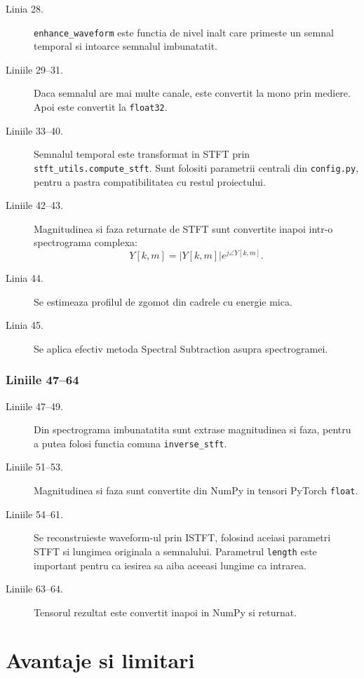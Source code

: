 \documentclass[12pt,a4paper]{report}
\newcommand{\codechunk}[2]{%
\subsection*{Liniile #1--#2}

}
\begin{document}
\begin{description}
    \item[Linia 28.] \texttt{enhance\_waveform} este functia de nivel inalt care
    primeste un semnal temporal si intoarce semnalul imbunatatit.

    \item[Liniile 29--31.] Daca semnalul are mai multe canale, este convertit la
    mono prin mediere. Apoi este convertit la \texttt{float32}.

    \item[Liniile 33--40.] Semnalul temporal este transformat in STFT prin
    \texttt{stft\_utils.compute\_stft}. Sunt folositi parametrii centrali din
    \texttt{config.py}, pentru a pastra compatibilitatea cu restul proiectului.

    \item[Liniile 42--43.] Magnitudinea si faza returnate de STFT sunt convertite
    inapoi intr-o spectrograma complexa:
    \[
    Y[k,m] = |Y[k,m]|e^{j\angle Y[k,m]}.
    \]

    \item[Linia 44.] Se estimeaza profilul de zgomot din cadrele cu energie mica.

    \item[Linia 45.] Se aplica efectiv metoda Spectral Subtraction asupra spectrogramei.
\end{description}

\codechunk{47}{64}

\begin{description}
    \item[Liniile 47--49.] Din spectrograma imbunatatita sunt extrase magnitudinea
    si faza, pentru a putea folosi functia comuna \texttt{inverse\_stft}.

    \item[Liniile 51--53.] Magnitudinea si faza sunt convertite din NumPy in tensori
    PyTorch \texttt{float}.

    \item[Liniile 54--61.] Se reconstruieste waveform-ul prin ISTFT, folosind aceiasi
    parametri STFT si lungimea originala a semnalului. Parametrul \texttt{length}
    este important pentru ca iesirea sa aiba aceeasi lungime ca intrarea.

    \item[Liniile 63--64.] Tensorul rezultat este convertit inapoi in NumPy si
    returnat.
\end{description}

\chapter{Avantaje si limitari}
\end{document}
